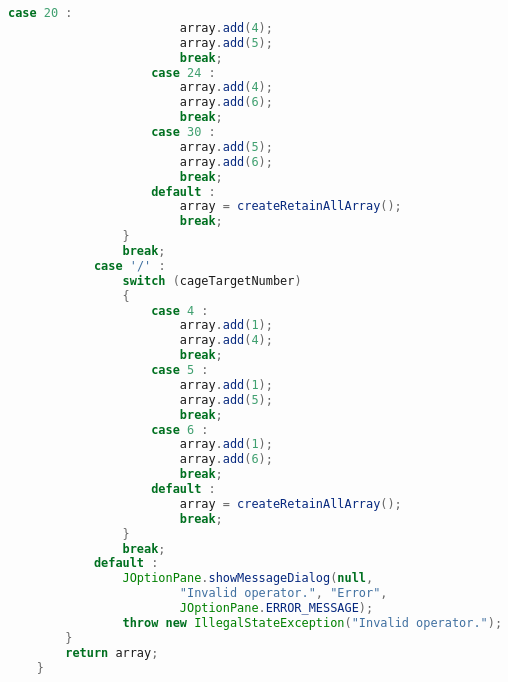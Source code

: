\begin{lstlisting}[language=Java,basicstyle=\tiny,caption=SolverRuleBased.java]
                    case 20 :
                        array.add(4);
                        array.add(5);
                        break;
                    case 24 :
                        array.add(4);
                        array.add(6);
                        break;
                    case 30 :
                        array.add(5);
                        array.add(6);
                        break;
                    default :
                        array = createRetainAllArray();
                        break;
                }
                break;
            case '/' :
                switch (cageTargetNumber)
                {
                    case 4 :
                        array.add(1);
                        array.add(4);
                        break;
                    case 5 :
                        array.add(1);
                        array.add(5);
                        break;
                    case 6 :
                        array.add(1);
                        array.add(6);
                        break;
                    default :
                        array = createRetainAllArray();
                        break;
                }
                break;
            default :
                JOptionPane.showMessageDialog(null, 
                        "Invalid operator.", "Error", 
                        JOptionPane.ERROR_MESSAGE);
                throw new IllegalStateException("Invalid operator.");
        }
        return array;
    }
    

\end{lstlisting}
